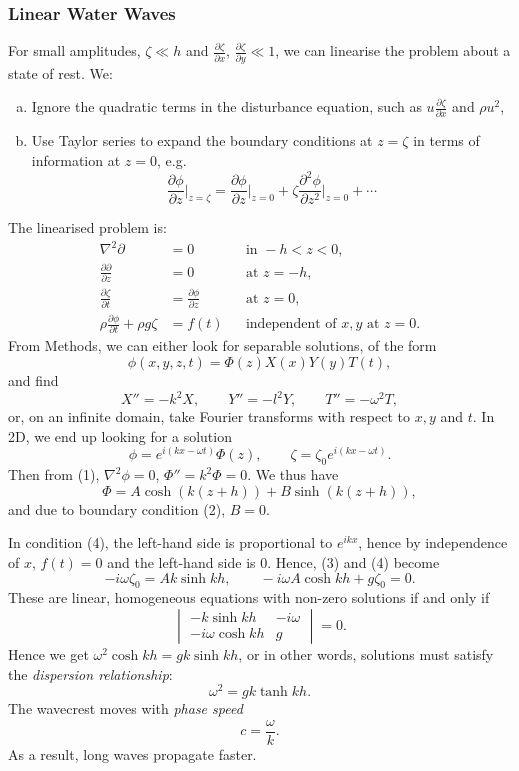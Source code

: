 \documentclass[12pt]{article}
\begin{document}
\subsubsection{Linear Water Waves}
\label{subsub:linear_water_waves}

For small amplitudes, $\zeta \ll h$ and $\frac{\partial \zeta}{\partial x}$, $\frac{\partial \zeta}{\partial y} \ll 1$, we can linearise the problem about a state of rest. We:
\begin{enumerate}[(a)]
	\item Ignore the quadratic terms in the disturbance equation, such as $u \frac{\partial \zeta}{\partial x}$ and $\rho u^2$,
	\item Use Taylor series to expand the boundary conditions at $z = \zeta$ in terms of information at $z = 0$, e.g.
		\[
		\frac{\partial \phi}{\partial z} \biggr|_{z = \zeta} = \frac{\partial \phi}{\partial z} \biggr|_{z = 0} + \zeta \frac{\partial^2 \phi}{\partial z^2} \biggr|_{z = 0} + \cdots
		\]
\end{enumerate}
The linearised problem is:
\begin{align*}
	\nabla^2 \partial &= 0 & &\text{in } -h < z < 0, \tag{1} \\
	\frac{\partial \partial}{\partial z} &= 0 & &\text{at } z = -h, \tag{2} \\
	\frac{\partial \zeta}{\partial t} &= \frac{\partial \phi}{\partial z} & &\text{at } z = 0, \tag{3} \\
	\rho \frac{\partial \phi}{\partial t} + \rho g \zeta &= f(t) & &\text{independent of } x, y \text{ at } z = 0. \tag{4}
\end{align*}
From Methods, we can either look for separable solutions, of the form
\[
\phi(x, y, z, t) = \Phi(z) X(x) Y(y) T(t),
\]
and find
\[
X'' = -k^2 X, \qquad Y'' = -l^2 Y, \qquad T'' = - \omega^2 T,
\]
or, on an infinite domain, take Fourier transforms with respect to $x, y$ and $t$. In 2D, we end up looking for a solution
\[
\phi = e^{i(kx - \omega t)}\Phi(z), \qquad \zeta = \zeta_0 e^{i(kx - \omega t)}.
\]
Then from (1), $\nabla^2 \phi = 0$, $\Phi'' = k^2 \Phi = 0$. We thus have
\[
\Phi = A \cosh (k(z+h)) + B \sinh (k(z+h)),
\]
and due to boundary condition (2), $B = 0$.

In condition (4), the left-hand side is proportional to $e^{ikx}$, hence by independence of $x$, $f(t) = 0$ and the left-hand side is $0$. Hence, (3) and (4) become
\[
-i \omega \zeta_0 = Ak\sinh kh, \qquad - i \omega A \cosh kh + g \zeta_0 = 0.
\]
These are linear, homogeneous equations with non-zero solutions if and only if
\[
\begin{vmatrix}
	-k \sinh kh & -i \omega \\  -i \omega \cosh kh & g
\end{vmatrix}
= 0.
\]
Hence we get $\omega^2 \cosh kh = gk \sinh kh$, or in other words, solutions must satisfy the \emph{dispersion relationship}:
\[
\omega^2 = gk \tanh kh.
\]
The wavecrest moves with \emph{phase speed}
\[
c = \frac{\omega}{k}.
\]
As a result, long waves propagate faster.
\end{document}
